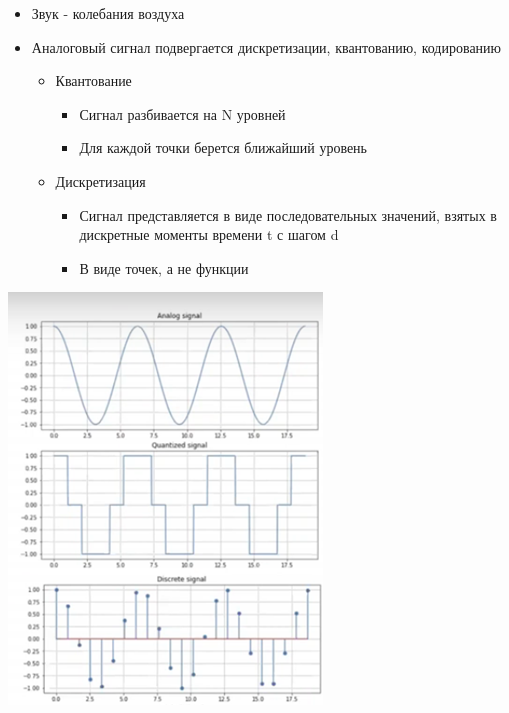 \documentclass[a4paper, 12pt]{article}
\begin{document}
\begin{itemize}
\item
  
  Звук - колебания воздуха
  
\item
  
  Аналоговый сигнал подвергается дискретизации, квантованию, кодированию
  

  \begin{itemize}
  \item
    
    {Квантование}
    

    \begin{itemize}
    \item
      
      Сигнал разбивается на N уровней
      
    \item
      
      Для каждой точки берется ближайший уровень
      
    \end{itemize}
  \item
    
    {Дискретизация}
    

    \begin{itemize}
    \item
      
      Сигнал представляется в виде последовательных значений, взятых в
      дискретные моменты времени t с шагом d
      
    \item
      
      В виде точек, а не функции
      
    \end{itemize}
  \end{itemize}
\end{itemize}

\includegraphics[width=3.28286in,height=4.29876in]{media/image25.png}
\end{document}
